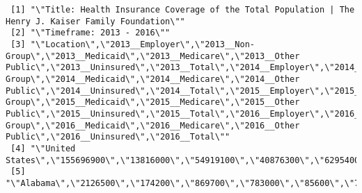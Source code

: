 \documentclass[]{article}
\begin{document}
\begin{verbatim}
 [1] "\"Title: Health Insurance Coverage of the Total Population | The Henry J. Kaiser Family Foundation\""                                                                                                                                                                                                                                                                                                                                                                                                                                                                        
 [2] "\"Timeframe: 2013 - 2016\""                                                                                                                                                                                                                                                                                                                                                                                                                                                                                                                                                  
 [3] "\"Location\",\"2013__Employer\",\"2013__Non-Group\",\"2013__Medicaid\",\"2013__Medicare\",\"2013__Other Public\",\"2013__Uninsured\",\"2013__Total\",\"2014__Employer\",\"2014__Non-Group\",\"2014__Medicaid\",\"2014__Medicare\",\"2014__Other Public\",\"2014__Uninsured\",\"2014__Total\",\"2015__Employer\",\"2015__Non-Group\",\"2015__Medicaid\",\"2015__Medicare\",\"2015__Other Public\",\"2015__Uninsured\",\"2015__Total\",\"2016__Employer\",\"2016__Non-Group\",\"2016__Medicaid\",\"2016__Medicare\",\"2016__Other Public\",\"2016__Uninsured\",\"2016__Total\""
 [4] "\"United States\",\"155696900\",\"13816000\",\"54919100\",\"40876300\",\"6295400\",\"41795100\",\"313401200\",\"154347500\",\"19313000\",\"61650400\",\"41896500\",\"5985000\",\"32967500\",\"316159900\",\"155965800\",\"21816500\",\"62384500\",\"43308400\",\"6422300\",\"28965900\",\"318868500\",\"157381500\",\"21884400\",\"62303400\",\"44550200\",\"6192200\",\"28051900\",\"320372000\""                                                                                                                                                                           
 [5] "\"Alabama\",\"2126500\",\"174200\",\"869700\",\"783000\",\"85600\",\"724800\",\"4763900\",\"2202800\",\"288900\",\"891900\",\"718400\",\"143900\",\"522200\",\"4768000\",\"2218000\",\"291500\",\"911400\",\"719100\",\"174600\",\"519400\",\"4833900\",\"2263800\",\"262400\",\"997000\",\"761200\",\"128800\",\"420800\",\"4834100\""                                                                                                                                                                                                                                      

\end{verbatim}
\end{document}
